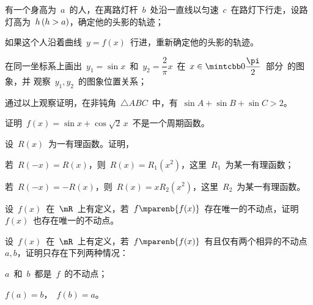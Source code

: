 \begin{exercise*}
\item\relax
\begin{exlist}
  \item 有一个身高为~$a$~的人，在离路灯杆~$b$~处沿一直线以匀速~$c$~在路灯下行走，设路灯高为~$h\mcond{h>a}$，确定他的头影的轨迹；
  \item 如果这个人沿着曲线~$y=f(x)$~行进，重新确定他的头影的轨迹。
\end{exlist}
\item\relax
\begin{exlist}
  \item 在同一坐标系上画出~$y_1=\sin x$~和~$y_2=\dfrac2\pi x$~在~$x\in\mintcbb 0{\dfrac\pi2}$~部分~的图象，并
        观察~$y_1,y_2$~的图象位置关系；
  \item 通过以上观察证明，在非钝角~$\triangle\mathit{ABC}$~中，有~$\sin A+\sin B+\sin C>2$。
\end{exlist}
\item 证明~$f(x)=\sin x+\cos\sqrt 2\,x$~不是一个周期函数。
\item 设~$R(x)$~为一有理函数。证明，
\begin{exlist}
  \item 若~$R(-x)=R(x)$，则~$R(x)=R_1(x^2)$，这里~$R_1$~为某一有理函数；
  \item 若~$R(-x)=-R(x)$，则~$R(x)=x R_2(x^2)$，这里~$R_2$~为某一有理函数。
\end{exlist}
\item 设~$f(x)$~在~$\mR$~上有定义，若~$f\mparenb{f(x)}$~存在唯一的不动点，证明~$f(x)$~也存在唯一的不动点。
\item 设~$f(x)$~在~$\mR$~上有定义，若~$f\mparenb{f(x)}$~有且仅有两个相异的不动点~$a,b$，证明只存在下列两种情况：
\begin{exlistcols}
  \item $a$~和~$b$~都是~$f$~的不动点；
  \item $f(a)=b$，~$f(b)=a$。
\end{exlistcols}
\end{exercise*}




\endinput
